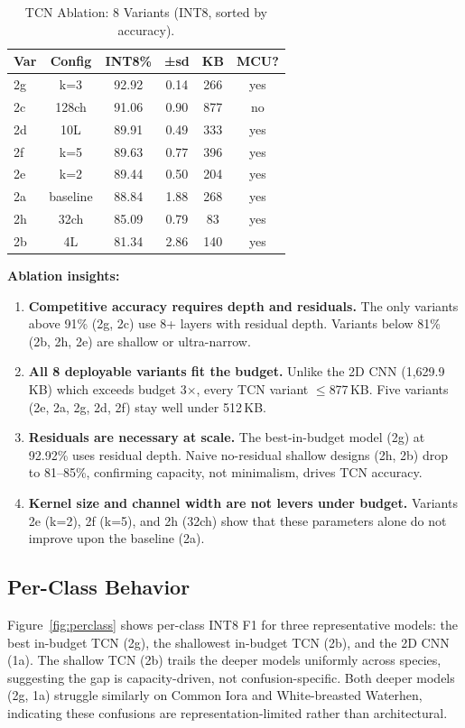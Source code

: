 \documentclass[conference]{IEEEtran}
\begin{document}
\begin{table}[h]
\centering
\caption{TCN Ablation: 8 Variants (INT8, sorted by accuracy).}
\small
\begin{tabular}{lccccc}
\toprule
\textbf{Var} & \textbf{Config} & \textbf{INT8\%} & \textbf{±sd} & \textbf{KB} & \textbf{MCU?} \\
\midrule
2g & k=3 & 92.92 & 0.14 & 266 & yes \\
2c & 128ch & 91.06 & 0.90 & 877 & no \\
2d & 10L & 89.91 & 0.49 & 333 & yes \\
2f & k=5 & 89.63 & 0.77 & 396 & yes \\
2e & k=2 & 89.44 & 0.50 & 204 & yes \\
2a & baseline & 88.84 & 1.88 & 268 & yes \\
2h & 32ch & 85.09 & 0.79 & 83 & yes \\
2b & 4L & 81.34 & 2.86 & 140 & yes \\
\bottomrule
\end{tabular}
\label{tab:tcn-ablation}
\end{table}

\textbf{Ablation insights:}
\begin{enumerate}
  \item \textbf{Competitive accuracy requires depth and residuals.} The only variants above 91\% (2g, 2c) use 8+ layers with residual depth. Variants below 81\% (2b, 2h, 2e) are shallow or ultra-narrow.
  \item \textbf{All 8 deployable variants fit the budget.} Unlike the 2D CNN (1{,}629.9\,KB) which exceeds budget 3$\times$, every TCN variant $\le$877\,KB. Five variants (2e, 2a, 2g, 2d, 2f) stay well under 512\,KB.
  \item \textbf{Residuals are necessary at scale.} The best-in-budget model (2g) at 92.92\% uses residual depth. Naive no-residual shallow designs (2h, 2b) drop to 81--85\%, confirming capacity, not minimalism, drives TCN accuracy.
  \item \textbf{Kernel size and channel width are not levers under budget.} Variants 2e (k=2), 2f (k=5), and 2h (32ch) show that these parameters alone do not improve upon the baseline (2a).
\end{enumerate}

\subsection{Per-Class Behavior}

Figure~\ref{fig:perclass} shows per-class INT8 F1 for three representative models: the best in-budget TCN (2g), the shallowest in-budget TCN (2b), and the 2D CNN (1a). The shallow TCN (2b) trails the deeper models uniformly across species, suggesting the gap is capacity-driven, not confusion-specific. Both deeper models (2g, 1a) struggle similarly on Common Iora and White-breasted Waterhen, indicating these confusions are representation-limited rather than architectural.
\end{document}
